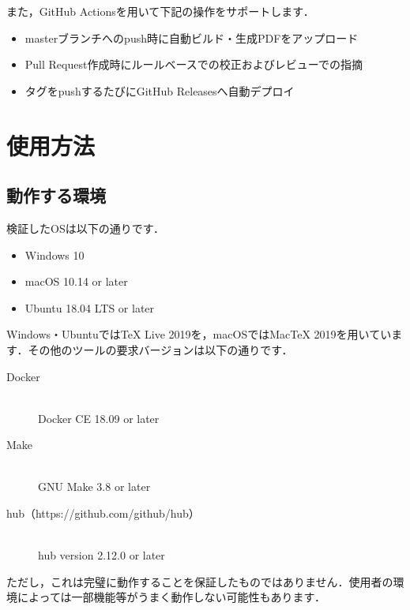 \documentclass{jsarticle}
\begin{document}
また，GitHub Actionsを用いて下記の操作をサポートします．

\begin{itemize}
    \item masterブランチへのpush時に自動ビルド・生成PDFをアップロード
    \item Pull Request作成時にルールベースでの校正およびレビューでの指摘
    \item タグをpushするたびにGitHub Releasesへ自動デプロイ
\end{itemize}

\section{使用方法}

\subsection{動作する環境}

検証したOSは以下の通りです．

\begin{itemize}
    \item Windows 10
    \item macOS 10.14 or later
    \item Ubuntu 18.04 LTS or later
\end{itemize}

Windows・UbuntuではTeX Live 2019を，macOSではMacTeX 2019を用いています．その他のツールの要求バージョンは以下の通りです．

\begin{description}
    \item[Docker]　\\
        Docker CE 18.09 or later
    \item[Make]　\\
        GNU Make 3.8 or later
    \item[hub（https://github.com/github/hub）]　\\
        hub version 2.12.0 or later
\end{description}

ただし，これは完璧に動作することを保証したものではありません．使用者の環境によっては一部機能等がうまく動作しない可能性もあります．
\end{document}
